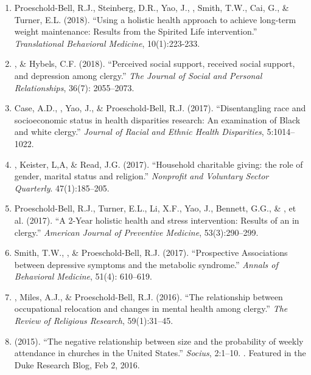 \begin{enumerate}
\item Proeschold-Bell, R.J., Steinberg, D.R., Yao, J., \Eagle, Smith, T.W., Cai, G., \& Turner, E.L. (2018). ``Using a holistic health approach to achieve long-term weight maintenance: Results from the Spirited Life intervention.'' \emph{Translational Behavioral Medicine}, 10(1):223-233. 

\item \Eagle, \& Hybels, C.F. (2018). ``Perceived social support, received social support, and depression among clergy.'' \emph{The Journal of Social and Personal Relationships}, 36(7): 2055--2073. 

\item Case, A.D., \Eagle, Yao, J., \& Proeschold-Bell, R.J. (2017). ``Disentangling race and socioeconomic status in health disparities research: An examination of Black and white clergy.'' \emph{Journal of Racial and Ethnic Health Disparities}, 5:1014--1022. 

\item \Eagle, Keister, L,A, \& Read, J.G. (2017). ``Household charitable giving: the role of gender, marital status and religion.'' \emph{Nonprofit and Voluntary Sector Quarterly}. 47(1):185--205. 

\item Proeschold-Bell, R.J., Turner, E.L., Li, X.F., Yao, J., Bennett, G.G., \& \Eagle, et al. (2017). ``A 2-Year holistic health and stress intervention: Results of an  in clergy.'' \emph{American Journal of Preventive Medicine}, 53(3):290--299. 

\item Smith, T.W., \Eagle\CF, \& Proeschold-Bell, R.J. (2017). ``Prospective Associations between depressive symptoms and the metabolic syndrome.'' \emph{Annals of Behavioral Medicine}, 51(4): 610--619. 

\item \Eagle, Miles, A.J., \& Proeschold-Bell, R.J. (2016). ``The relationship between occupational relocation and changes in mental health among clergy.'' \emph{The Review of Religious Research}, 59(1):31--45. 

\item \Eagle \hspace{.01em} (2015). ``The negative relationship between size and the probability of weekly attendance in churches in the United States.'' \emph{Socius}, 2:1--10.  . Featured in the Duke Research Blog, Feb 2, 2016.


\end{enumerate}
